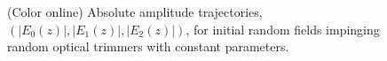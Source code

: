 \documentclass[9pt,twocolumn,twoside]{osajnl}
\begin{document}
%

\begin{figure}[htbp]
\centering
{}
\caption{(Color online) Absolute amplitude trajectories, $(\vert E_{0}(z) \vert, \vert E_{1}(z) \vert, \vert E_{2}(z) \vert )$, for initial random fields impinging random optical trimmers with constant parameters.}
\label{fig: Fig2}
\end{figure}

\end{document}
